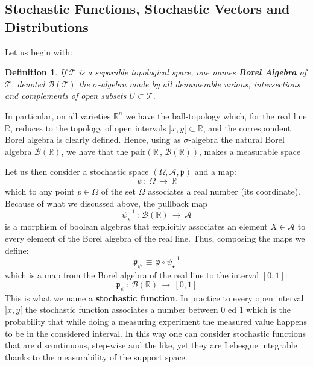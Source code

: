 \documentclass[10pt,a4paper]{article}
\newtheorem{definizione}{Definition}[section]
\begin{document}
\subsection{Stochastic Functions, Stochastic Vectors  and  Distributions}
Let us begin with:
\begin{definizione} If $\mathcal{T}$ is a separable topological space,  one names \textbf{Borel Algebra} of $\mathcal{T}$, denoted
$\mathcal{B}(\mathcal{T})$  the $\sigma$-algebra made by all
denumerable unions,  intersections and complements of open subsets
$U\subset\mathcal{T}$.
\end{definizione}
In particular, on all varieties $\mathbb{R}^n$ we have the ball-topology
which, for the real line $\mathbb{R}$, reduces to the
topology of open intervals $]x,y[ \subset \mathbb{R}$, and the correspondent
Borel algebra is clearly defined.
Hence, using as $\sigma$-algebra the natural
Borel algebra $\mathcal{B}(\mathbb{R})$,  we have that the pair$\left(
\mathbb{R}\, ,\,\mathcal{B}(\mathbb{R})\right)$, makes a measurable space
\par
Let us then consider a stochastic space
$\left(\Omega,\mathcal{A},\mathfrak{p}\right)$ and a map:
\begin{equation}\label{coronafine}
    \psi \, : \, \Omega \, \rightarrow \, \mathbb{R}
\end{equation}
which to any point   $p \in \Omega$  of the set $\Omega$ associates a real number (its coordinate).
Because of what we discussed above, the pullback map
\begin{equation}\label{polloalladiavola}
    \psi^{-1}_\star \, : \, \mathcal{B}(\mathbb{R}) \, \rightarrow
    \, \mathcal{A}
\end{equation}
is a morphism of  boolean algebras that  explicitly associates an
element $X\in \mathcal{A}$ to every element of the Borel
algebra of the real line. Thus, composing the maps we define:
\begin{equation}\label{cornutella}
    \mathfrak{p}_{\psi} \, \equiv \, \mathfrak{p}\circ\psi^{-1}_\star
\end{equation}
which is a map from the  Borel algebra of the real line to the interval
$[0,1]$:
\begin{equation}\label{cromatogno}
    \mathfrak{p}_\psi \, : \, \mathcal{B}\left(\mathbb{R}\right) \, \rightarrow \,
    [0,1]
\end{equation}
This is what we name a \textbf{stochastic function}. In practice  to every open interval $]x,y[$
the stochastic function associates a number between $0$ ed $1$  which is the probability
that while doing a measuring experiment the measured value happens to be in the considered interval.
In this way one can consider stochastic functions that are discontinuous, step-wise and the like, yet they are Lebesgue integrable
thanks to the measurability of the support space.
\end{document}
